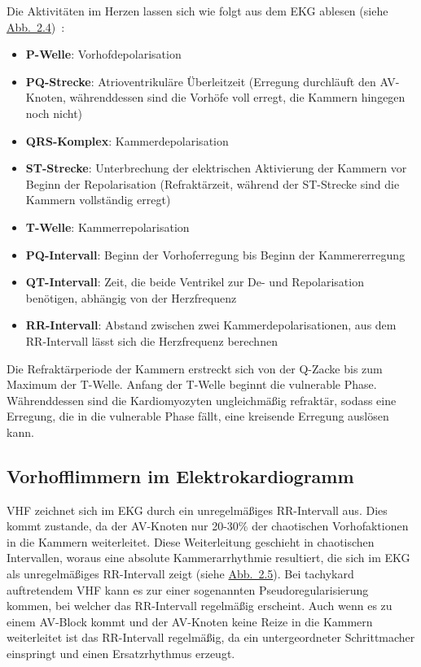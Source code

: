 Die Aktivitäten im Herzen lassen sich wie folgt aus dem \gls{EKG} ablesen (siehe \hyperref[fig:EKG]{Abb.~2.4})~\cite{rizwan_review_2021}:
\begin{itemize}
\item \textbf{P-Welle}: Vorhofdepolarisation
\item \textbf{PQ-Strecke}: Atrioventrikuläre Überleitzeit (Erregung durchläuft den AV-Knoten, währenddessen sind die Vorhöfe voll erregt, die Kammern hingegen noch nicht)
\item \textbf{QRS-Komplex}: Kammerdepolarisation
\item \textbf{ST-Strecke}: Unterbrechung der elektrischen Aktivierung der Kammern vor Beginn der Repolarisation (Refraktärzeit, während der ST-Strecke sind die Kammern vollständig erregt)

\item \textbf{T-Welle}: Kammerrepolarisation
\item \textbf{PQ-Intervall}: Beginn der Vorhoferregung bis Beginn der Kammererregung \cite{faller_korper_2004}
\item \textbf{QT-Intervall}: Zeit, die beide Ventrikel zur De- und Repolarisation benötigen, abhängig von der Herzfrequenz \cite{faller_korper_2004}
\item \textbf{RR-Intervall}: Abstand zwischen zwei Kammerdepolarisationen, aus dem RR-Intervall lässt sich die Herzfrequenz berechnen
\end{itemize}

Die Refraktärperiode der Kammern erstreckt sich von der Q-Zacke bis zum Maximum der T-Welle. Anfang der T-Welle beginnt die vulnerable Phase. Währenddessen sind die Kardiomyozyten   
ungleichmäßig refraktär, sodass eine Erregung, die in die vulnerable Phase fällt, eine kreisende Erregung auslösen kann. \cite{schmidt_physiologie_2005}

\subsection{Vorhofflimmern im Elektrokardiogramm}

\gls{VHF} zeichnet sich im \gls{EKG} durch ein unregelmäßiges RR-Intervall aus. Dies kommt zustande, da der \gls{AV-Knoten} nur 20-30\% der chaotischen Vorhofaktionen in die Kammern weiterleitet. Diese Weiterleitung geschieht in chaotischen Intervallen, woraus eine absolute Kammerarrhythmie resultiert, die sich im \gls{EKG} als unregelmäßiges RR-Intervall zeigt (siehe \hyperref[fig:EKG_afib]{Abb.~2.5}). Bei tachykard auftretendem \gls{VHF} kann es zur einer sogenannten Pseudoregularisierung kommen, bei welcher das RR-Intervall regelmäßig erscheint. Auch wenn es zu einem AV-Block kommt und der \gls{AV-Knoten} keine Reize in die Kammern weiterleitet ist das RR-Intervall regelmäßig, da ein untergeordneter Schrittmacher einspringt und einen Ersatzrhythmus erzeugt.

